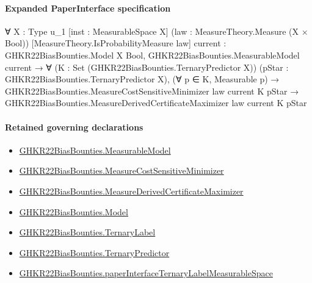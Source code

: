 \documentclass[10pt]{article}
\begin{document}
\paragraph{Expanded PaperInterface specification}
\begin{ReviewVerbatim}
∀ {X : Type u_1} [inst : MeasurableSpace X] (law : MeasureTheory.Measure (X × Bool))
  [MeasureTheory.IsProbabilityMeasure law] {current : GHKR22BiasBounties.Model X Bool},
  GHKR22BiasBounties.MeasurableModel current →
    ∀ (K : Set (GHKR22BiasBounties.TernaryPredictor X)) (pStar : GHKR22BiasBounties.TernaryPredictor X),
      (∀ p ∈ K, Measurable p) →
        GHKR22BiasBounties.MeasureCostSensitiveMinimizer law current K pStar →
          GHKR22BiasBounties.MeasureDerivedCertificateMaximizer law current K pStar
\end{ReviewVerbatim}

\paragraph{Retained governing declarations}
\begin{itemize}\raggedright
\item \hyperlink{governing-declaration-8b721c00962c326a}{GHKR22\allowbreak{}Bias\allowbreak{}Bounties.\allowbreak{}Measurable\allowbreak{}Model}
\item \hyperlink{paper-prerequisite-3fd4c7633d9c94db}{GHKR22\allowbreak{}Bias\allowbreak{}Bounties.\allowbreak{}Measure\allowbreak{}Cost\allowbreak{}Sensitive\allowbreak{}Minimizer}
\item \hyperlink{governing-declaration-3eceb3e76df4d01d}{GHKR22\allowbreak{}Bias\allowbreak{}Bounties.\allowbreak{}Measure\allowbreak{}Derived\allowbreak{}Certificate\allowbreak{}Maximizer}
\item \hyperlink{paper-prerequisite-333127605c12eba8}{GHKR22\allowbreak{}Bias\allowbreak{}Bounties.\allowbreak{}Model}
\item \hyperlink{governing-declaration-5996c0925e42d122}{GHKR22\allowbreak{}Bias\allowbreak{}Bounties.\allowbreak{}Ternary\allowbreak{}Label}
\item \hyperlink{governing-declaration-4314b94d61ded700}{GHKR22\allowbreak{}Bias\allowbreak{}Bounties.\allowbreak{}Ternary\allowbreak{}Predictor}
\item \hyperlink{governing-declaration-e8c3e4e4256aa674}{GHKR22\allowbreak{}Bias\allowbreak{}Bounties.\allowbreak{}paper\allowbreak{}Interface\allowbreak{}Ternary\allowbreak{}Label\allowbreak{}Measurable\allowbreak{}Space}
\end{itemize}
\end{document}
